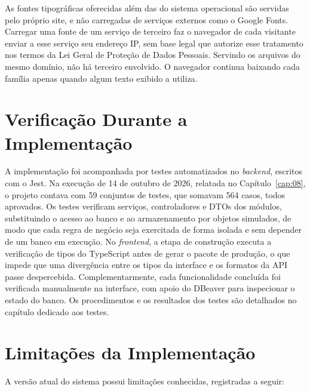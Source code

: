 As fontes tipográficas oferecidas além das do sistema operacional são servidas pelo próprio site, e não carregadas de serviços externos como o Google Fonts. Carregar uma fonte de um serviço de terceiro faz o navegador de cada visitante enviar a esse serviço seu endereço IP, sem base legal que autorize esse tratamento nos termos da Lei Geral de Proteção de Dados Pessoais. Servindo os arquivos do mesmo domínio, não há terceiro envolvido. O navegador continua baixando cada família apenas quando algum texto exibido a utiliza.

\section{Verificação Durante a Implementação}

A implementação foi acompanhada por testes automatizados no \textit{backend}, escritos com o Jest. Na execução de 14 de outubro de 2026, relatada no Capítulo~\ref{cap:08}, o projeto contava com 59 conjuntos de testes, que somavam 564 casos, todos aprovados. Os testes verificam serviços, controladores e DTOs dos módulos, substituindo o acesso ao banco e ao armazenamento por objetos simulados, de modo que cada regra de negócio seja exercitada de forma isolada e sem depender de um banco em execução. No \textit{frontend}, a etapa de construção executa a verificação de tipos do TypeScript antes de gerar o pacote de produção, o que impede que uma divergência entre os tipos da interface e os formatos da API passe despercebida. Complementarmente, cada funcionalidade concluída foi verificada manualmente na interface, com apoio do DBeaver para inspecionar o estado do banco. Os procedimentos e os resultados dos testes são detalhados no capítulo dedicado aos testes.

\section{Limitações da Implementação}

A versão atual do sistema possui limitações conhecidas, registradas a seguir:

